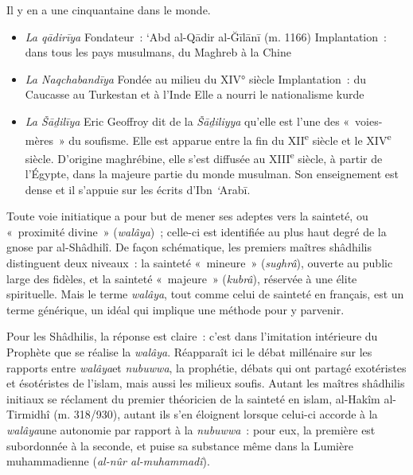 Il y en a une cinquantaine dans le monde.

\begin{itemize}
\item
  \textit{La qādirīya} \label{Def:Soufiqādirīya}
Fondateur~: `Abd al-Qādir al-Ğīlānī (m. 1166)
Implantation~: dans tous les pays musulmans, du Maghreb à la Chine


\item
  \textit{La Naqchabandīya} \label{Def:SoufiNaqchabandiya}
Fondée au milieu du XIV° siècle
Implantation~: du Caucasse au Turkestan et à l'Inde
Elle a nourri le nationalisme kurde


\item
  \textit{La Šāḏilīya} \label{Def:Soufisadiliya}
Eric Geoffroy dit de la \emph{Šāḏiliyya} qu'elle est l'une des
«~voies-mères~» du soufisme. Elle est apparue entre la fin du
XII\textsuperscript{e} siècle et le XIV\textsuperscript{e} siècle.
D'origine maghrébine, elle s'est diffusée au XIII\textsuperscript{e}
siècle, à partir de l'Égypte, dans la majeure partie du monde musulman.
Son enseignement est dense et il s'appuie sur les écrits d'Ibn
\emph{`}Arabī.
\end{itemize}
Toute voie initiatique a pour but de mener ses adeptes vers la sainteté,
ou «~proximité divine~» (\emph{walâya})~; celle-ci est identifiée au
plus haut degré de la gnose par al-Shâdhilî. De façon schématique, les
premiers maîtres shâdhilis distinguent deux niveaux~: la sainteté
«~mineure~» (\emph{sughrâ}), ouverte au public large des fidèles, et la
sainteté «~majeure~» (\emph{kubrâ}), réservée à une élite spirituelle.
Mais le terme \emph{walâya}, tout comme celui de sainteté en français,
est un terme générique, un idéal qui implique une méthode pour y
parvenir.

Pour les Shâdhilis, la réponse est claire~: c'est dans l'imitation
intérieure du Prophète que se réalise la \emph{walâya}. Réapparaît ici
le débat millénaire sur les rapports entre \emph{walâya}et
\emph{nubuwwa}, la prophétie, débats qui ont partagé exotéristes et
ésotéristes de l'islam, mais aussi les milieux soufis. Autant les
maîtres shâdhilis initiaux se réclament du premier théoricien de la
sainteté en islam, al-Hakîm al-Tirmidhî (m. 318/930), autant ils s'en
éloignent lorsque celui-ci accorde à la \emph{walâya}une autonomie par
rapport à la \emph{nubuwwa}~: pour eux, la première est subordonnée à la
seconde, et puise sa substance même dans la Lumière muhammadienne
(\emph{al-nûr al-muhammadî}).

